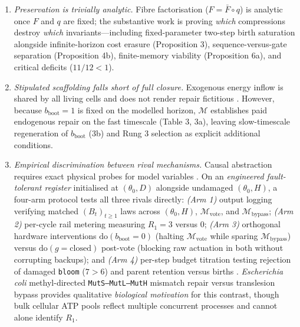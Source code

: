 \documentclass[12pt,letterpaper]{article}
\begin{document}
\begin{enumerate}
  \citep{mayo2018}.
\item
  \emph{Preservation is trivially analytic.} Fibre factorisation
  (\(F = \bar{F}\circ q\)) is analytic once \(F\) and \(q\) are fixed;
  the substantive work is proving \emph{which} compressions destroy
  \emph{which} invariants---including fixed-parameter two-step birth
  saturation alongside infinite-horizon cost erasure (Proposition 3),
  sequence-versus-gate separation (Proposition 4b), finite-memory
  viability (Proposition 6a), and critical deficits (\(11/12 < 1\)).
\item
  \emph{Stipulated scaffolding falls short of full closure.} Exogenous
  energy inflow is shared by all living cells and does not render repair
  fictitious \citep{jonas1966, montevilMossio2015}. However, because
  \(b_{\mathrm{boot}}=1\) is fixed on the modelled horizon,
  \(\mathcal{M}\) establishes paid endogenous repair on the fast
  timescale (Table 3, 3a), leaving slow-timescale regeneration of
  \(b_{\mathrm{boot}}\) (3b) and Rung 3 selection as explicit additional
  conditions.
\item
  \emph{Empirical discrimination between rival mechanisms.} Causal
  abstraction requires exact physical probes for model variables
  \citep{craver2007, rubenstein2017}. On an \emph{engineered
  fault-tolerant register} initialised at \((\theta_0, D)\) alongside
  undamaged \((\theta_0, H)\), a four-arm protocol tests all three
  rivals directly: \emph{(Arm 1)} output logging verifying matched
  \((B_t)_{t\ge 1}\) laws across \((\theta_0, H)\),
  \(\mathcal{M}_{\mathrm{vote}}\), and
  \(\mathcal{M}_{\mathrm{bypass}}\); \emph{(Arm 2)} per-cycle rail
  metering measuring \(R_1 = 3\) versus \(0\); \emph{(Arm 3)} orthogonal
  hardware interventions \(\mathrm{do}(b_{\mathrm{boot}}=0)\) (halting
  \(\mathcal{M}_{\mathrm{vote}}\) while sparing
  \(\mathcal{M}_{\mathrm{bypass}}\)) versus
  \(\mathrm{do}(g=\mathrm{closed})\) post-vote (blocking raw actuation
  in both without corrupting backups); and \emph{(Arm 4)} per-step
  budget titration testing rejection of damaged \texttt{bloom}
  (\(7 > 6\)) and parent retention versus births \citep{mayo2018}.
  \emph{Escherichia coli} methyl-directed \texttt{MutS–MutL–MutH}
  mismatch repair versus translesion bypass
  \citep{auWelshModrich1992, hasanLeach2015} provides qualitative
  \emph{biological motivation} for this contrast, though bulk cellular
  ATP pools reflect multiple concurrent processes and cannot alone
  identify \(R_1\).
\end{enumerate}
\end{document}
